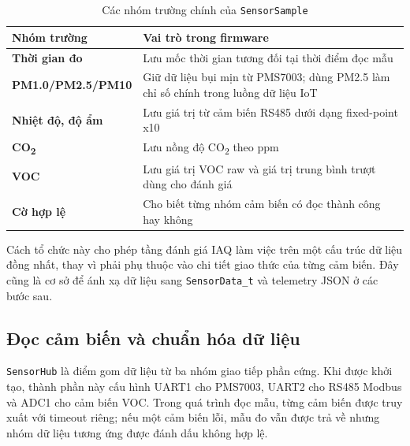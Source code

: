 \begin{table}[H]
    \centering
    \caption{Các nhóm trường chính của \texttt{SensorSample}}
    \begin{tabularx}{\textwidth}{>{\bfseries}l X}
        \toprule
        Nhóm trường & Vai trò trong firmware \\
        \midrule
        Thời gian đo & Lưu mốc thời gian tương đối tại thời điểm đọc mẫu \\
        PM1.0/PM2.5/PM10 & Giữ dữ liệu bụi mịn từ PMS7003; dùng PM2.5 làm chỉ số chính trong luồng dữ liệu IoT \\
        Nhiệt độ, độ ẩm & Lưu giá trị từ cảm biến RS485 dưới dạng fixed-point x10 \\
        CO\textsubscript{2} & Lưu nồng độ CO\textsubscript{2} theo ppm \\
        VOC & Lưu giá trị VOC raw và giá trị trung bình trượt dùng cho đánh giá \\
        Cờ hợp lệ & Cho biết từng nhóm cảm biến có đọc thành công hay không \\
        \bottomrule
    \end{tabularx}
\end{table}

Cách tổ chức này cho phép tầng đánh giá IAQ làm việc trên một cấu trúc dữ liệu đồng
nhất, thay vì phải phụ thuộc vào chi tiết giao thức của từng cảm biến. Đây cũng là cơ sở
để ánh xạ dữ liệu sang \texttt{SensorData\_t} và telemetry JSON ở các bước sau.

\subsection{Đọc cảm biến và chuẩn hóa dữ liệu}

\texttt{SensorHub} là điểm gom dữ liệu từ ba nhóm giao tiếp phần cứng. Khi được khởi tạo,
thành phần này cấu hình UART1 cho PMS7003, UART2 cho RS485 Modbus và ADC1 cho cảm biến
VOC. Trong quá trình đọc mẫu, từng cảm biến được truy xuất với timeout riêng; nếu một
cảm biến lỗi, mẫu đo vẫn được trả về nhưng nhóm dữ liệu tương ứng được đánh dấu không
hợp lệ.

